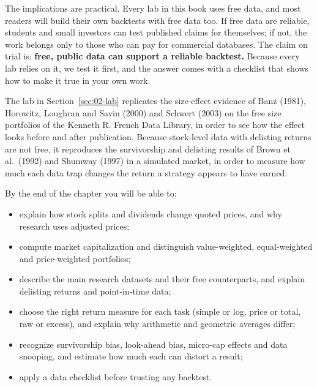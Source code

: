 The implications are practical. Every lab in this book uses free data, and most readers will build their own backtests with free data too. If free data are reliable, students and small investors can test published claims for themselves; if not, the work belongs only to those who can pay for commercial databases. The claim on trial is: \textbf{free, public data can support a reliable backtest.} Because every lab relies on it, we test it first, and the answer comes with a checklist that shows how to make it true in your own work.

The lab in Section~\ref{sec:02-lab} replicates the size-effect evidence of Banz (1981), Horowitz, Loughran and Savin (2000) and Schwert (2003) on the free size portfolios of the Kenneth R. French Data Library, in order to see how the effect looks before and after publication. Because stock-level data with delisting returns are not free, it reproduces the survivorship and delisting results of Brown et al.\ (1992) and Shumway (1997) in a simulated market, in order to measure how much each data trap changes the return a strategy appears to have earned.

By the end of the chapter you will be able to:

\begin{itemize}
  \item explain how stock splits and dividends change quoted prices, and why research uses adjusted prices;
  \item compute market capitalization and distinguish value-weighted, equal-weighted and price-weighted portfolios;
  \item describe the main research datasets and their free counterparts, and explain delisting returns and point-in-time data;
  \item choose the right return measure for each task (simple or log, price or total, raw or excess), and explain why arithmetic and geometric averages differ;
  \item recognize survivorship bias, look-ahead bias, micro-cap effects and data snooping, and estimate how much each can distort a result;
  \item apply a data checklist before trusting any backtest.
\end{itemize}

